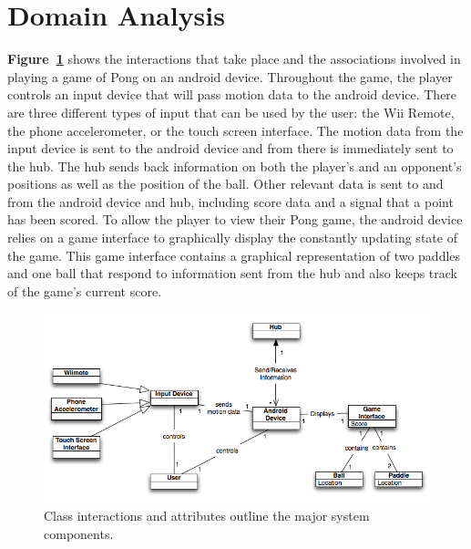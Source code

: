 \documentclass[12pt]{article}
\begin{document}
\section{Domain Analysis}
\textbf{Figure~\ref{domainModel}} shows the interactions that take place and the associations involved in playing a game of Pong on an android device.  Throughout the game, the player controls an input device that will pass motion data to the android device.  There are three different types of input that can be used by the user: the Wii Remote, the phone accelerometer, or the touch screen interface.  The motion data from the input device is sent to the android device and from there is immediately sent to the hub.  The hub sends back information on both the player's and an opponent's positions as well as the position of the ball.  Other relevant data is sent to and from the android device and hub, including score data and a signal that a point has been scored.  To allow the player to view their Pong game, the android device relies on a game interface to graphically display the constantly updating state of the game.  This game interface contains a graphical representation of two paddles and one ball that respond to information sent from the hub and also keeps track of the game's current score.
\begin{figure}
\begin{center}
\includegraphics[scale=.7]{domainModel_Android-1.png}
\caption{\label{domainModel}Class interactions and attributes outline the major system components.}
\end{center}
\end{figure}
\end{document}
